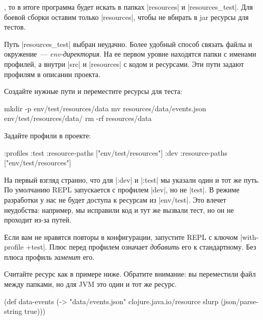 \noindent
, то в итоге программа будет искать в папках \spverb|resources| и
\spverb|resources_test|. Для боевой сборки оставим только \spverb|resources|,
чтобы не вбирать в jar ресурсы для тестов.

Путь \spverb|resources_test| выбран неудачно. Более удобный способ связать файлы
и окружение~--- \emph{env-директория}. На ее первом уровне находятся папки с
именами профилей, а внутри \spverb|src| и \spverb|resources| с кодом и
ресурсами. Эти пути задают профилям в описании проекта.

Создайте нужные пути и переместите ресурсы для теста:

\begin{english}
  \begin{bash}
mkdir -p env/test/resources/data
mv resources/data/events.json env/test/resources/data/
rm -rf resources/data
  \end{bash}
\end{english}

Задайте профили в проекте:

\begin{english}
  \begin{clojure}
:profiles {:test {:resource-paths ["env/test/resources"]}
           :dev  {:resource-paths ["env/test/resources"]}}
  \end{clojure}
\end{english}

На первый взгляд странно, что для \spverb|:dev| и \spverb|:test| мы указали один
и тот же путь. По умолчанию REPL запускается с профилем \spverb|dev|, но не
\spverb|test|. В режиме разработки у нас не будет доступа к ресурсам из
\spverb|env/test|. Это влечет неудобства: например, мы исправили код и тут же
вызвали тест, но он не проходит из-за путей.

Если вам не нравятся повторы в конфигурации, запустите REPL с ключом
\spverb|with-profile +test|. Плюс перед профилем означает \emph{добавить} его к
стандартному. Без плюса профиль \emph{заменит} его.

Считайте ресурс как в примере ниже. Обратите внимание: вы переместили файл между
папками, но для JVM это один и тот же ресурс.

\begin{english}
  \begin{clojure}
(def data-events
  (-> "data/events.json"
      clojure.java.io/resource
      slurp
      (json/parse-string true)))
  \end{clojure}
\end{english}

